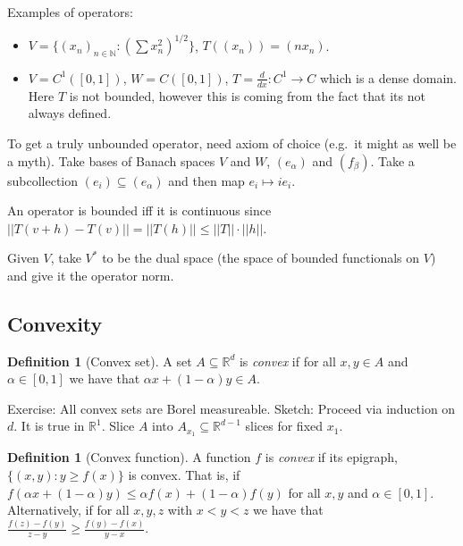 \documentclass{article}
\theoremstyle{definition}
\newtheorem{definition}[theorem]{Definition}
\begin{document}
Examples of operators: 
\begin{itemize}
    \item \(V=\{{(x_n)}_{n\in\mathbb{N}}: {\left(\sum x_n^2\right)}^{1/2}\} \), \(T((x_n))=(nx_n)\).
    \item \(V=C^1([0,1])\), \(W=C([0,1])\), \(T=\frac{d}{dx}:C^1\rightarrow C\) which is a dense domain. Here \(T\) is
    not bounded, however this is coming from the fact that its not always defined.
\end{itemize}

To get a truly unbounded operator, need axiom of choice (e.g.\ it might as well be a myth). Take bases of Banach spaces
\(V\) and \(W\), \((e_\alpha)\) and \((f_\beta)\). Take a subcollection \((e_i)\subseteq (e_\alpha)\) and then map
\(e_i\mapsto ie_i\).

An operator is bounded iff it is continuous since \(||T(v+h)-T(v)||=||T(h)||\leq ||T||\cdot ||h||\).

Given \(V\), take \(V^*\) to be the dual space (the space of bounded functionals on \(V\)) and give it the operator
norm.

\subsection{Convexity}

\begin{definition}[Convex set]
    A set \(A\subseteq \mathbb{R}^d\) is \textit{convex} if for all \(x,y\in A\) and \(\alpha\in[0,1]\) we have that
    \(\alpha x+(1-\alpha)y\in A\).
\end{definition}

Exercise: All convex sets are Borel measureable. Sketch: Proceed via induction on \(d\). It is true in \(\mathbb{R}^1\). Slice
\(A\) into \(A_{x_1}\subseteq\mathbb{R}^{d-1}\) slices for fixed \(x_1\).

\begin{definition}[Convex function]
    A function \(f\) is \textit{convex} if its epigraph, \( \{(x,y):y\geq f(x)\} \) is convex. That is, if
    \(f(\alpha x+(1-\alpha) y)\leq \alpha f(x)+(1-\alpha) f(y)\) for all \(x,y\) and \(\alpha\in[0,1]\). Alternatively,
    if for all \(x,y,z\) with \(x<y<z\) we have that \(\frac{f(z)-f(y)}{z-y}\geq \frac{f(y)-f(x)}{y-x}\).
\end{definition}
\end{document}

